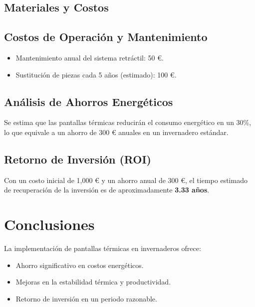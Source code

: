 \begin{Form}
\begin{center}
\end{center}

\newpage



\subsection{Materiales y Costos}




\subsection{Costos de Operación y Mantenimiento}
\begin{itemize}
    \item Mantenimiento anual del sistema retráctil: 50 €.
    \item Sustitución de piezas cada 5 años (estimado): 100 €.
\end{itemize}

\subsection{Análisis de Ahorros Energéticos}
Se estima que las pantallas térmicas reducirán el consumo energético en un 30\%, lo que equivale a un ahorro de 300 € anuales en un invernadero estándar.

\subsection{Retorno de Inversión (ROI)}
Con un costo inicial de 1,000 € y un ahorro anual de 300 €, el tiempo estimado de recuperación de la inversión es de aproximadamente \textbf{3.33 años}.

\section{Conclusiones}
La implementación de pantallas térmicas en invernaderos ofrece:
\begin{itemize}
    \item Ahorro significativo en costos energéticos.
    \item Mejoras en la estabilidad térmica y productividad.
    \item Retorno de inversión en un periodo razonable.
\end{itemize}



\end{Form}
